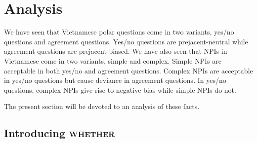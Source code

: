\documentclass[output=paper,colorlinks,citecolor=brown]{langscibook}
\begin{document}

\section{Analysis \label{analysis} }

We have seen that Vietnamese polar questions come in two variants, yes/no questions and agreement questions. Yes/no questions are prejacent-neutral while agreement questions are prejacent-biased. We have also seen that NPIs in Vietnamese come in two variants, simple and complex. Simple NPIs are acceptable in both yes/no and agreement questions. Complex NPIs are acceptable in yes/no questions but cause deviance in agreement questions. In yes/no questions, complex NPIs give rise to negative bias while simple NPIs do not.

The present section will be devoted to an analysis of these facts.


\subsection{Introducing \textsc{whether} }
\end{document}
